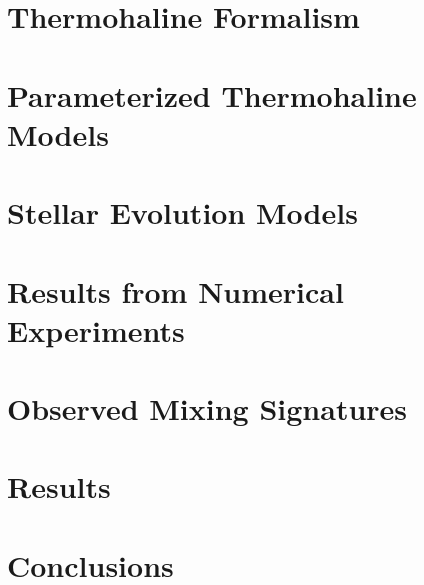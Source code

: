 \documentclass[linenumbers,twocolumn]{aastex62}
\begin{document}
\section{Thermohaline Formalism }
\label{sec:formalism}


\section{Parameterized Thermohaline Models }
\label{sec:parameterizations}


\section{Stellar Evolution Models} %
\label{sec:mesa_experiment}


\section{Results from Numerical Experiments }
\label{sec:mesa_results}


\section{Observed Mixing Signatures }
\label{sec:obs}


\section{Results} 
\label{sec:punchline}


\section{Conclusions }
\label{sec:conclusions}



\begin{comment}
\begin{figure}[!htb]
\begin{center}
\texttt{[image: ./Figs/protversusloggmodelpmmPYboth.eps]}%
\caption{The measured core rotation rates for the stars in our sample as a function of gravity compared to the predictions of our solid body model (lue) and our moerately differentially convection zone (pink), showing that these models provide limits on the allowable amount of radial differential rotation in the surface convection zone.}
\label{Fig:bothmodels}
\end{center}
\end{figure}
\end{comment}
\end{document}
